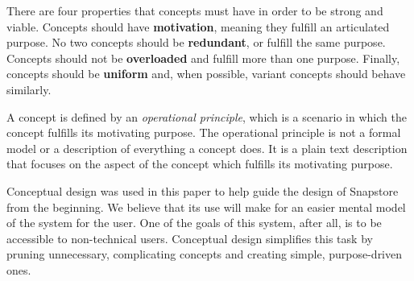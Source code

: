 There are four properties that concepts must have in order to be strong and viable. Concepts should have \textbf{motivation}, meaning they fulfill an articulated purpose. No two concepts should be \textbf{redundant}, or fulfill the same purpose. Concepts should not be \textbf{overloaded} and fulfill more than one purpose. Finally, concepts should be \textbf{uniform} and, when possible, variant concepts should behave similarly.

A concept is defined by an \textit{operational principle}, which is a scenario in which the concept fulfills its motivating purpose. The operational principle is not a formal model or a description of everything a concept does. It is a plain text description that focuses on the aspect of the concept which fulfills its motivating purpose.

Conceptual design was used in this paper to help guide the design of Snapstore from the beginning. We believe that its use will make for an easier mental model of the system for the user. One of the goals of this system, after all, is to be accessible to non-technical users. Conceptual design simplifies this task by pruning unnecessary, complicating concepts and creating simple, purpose-driven ones.



